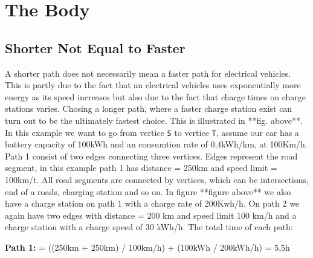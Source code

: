 \section{The Body}

\subsection{Shorter Not Equal to Faster}\label{sec:shortestnotfastest}


A shorter path does not necessarily mean a faster path for electrical vehicles. 
This is partly due to the fact that an electrical vehicles uses exponentially more energy 
as its speed increases but also due to the fact that charge times on charge stations
varies. Chosing a longer path, where a faster charge station exist can turn out to
be the ultimately fastest choice. This is illustrated in **fig. above**. In this example we want to go from vertice \texttt{S} to vertice \texttt{T}, assume our car has a battery capacity of 100kWh and an consumtion rate of 0,4kWh/km, at 100Km/h. Path 1 consist of two edges connecting three vertices. Edges represent the road segment, in this example path 1 has distance = 250km and speed limit = 100km/t. All road segments are connected by vertices, which can be intersections, end of a roads, charging station and so on. In figure **figure above** we also have a charge station on path 1 with a charge rate of 200Kwh/h. On path 2 we again have two edges with distance = 200 km and speed limit 100 km/h and a charge station with a charge speed of 30 kWh/h.
The total time of each path:

\textbf{Path 1:}  = ((250km + 250km) / 100km/h) + (100kWh / 200kWh/h) = 5,5h

